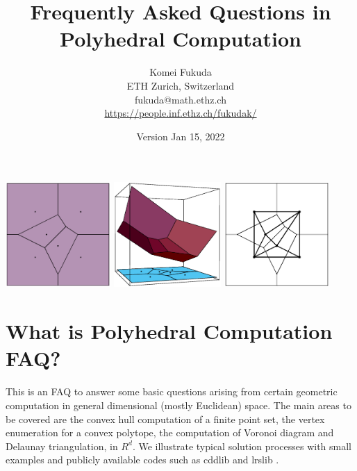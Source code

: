 \documentclass[[a4paper,12pt]{article}
\title
{Frequently Asked Questions in Polyhedral Computation}
\author
{{Komei Fukuda}\\
   ETH Zurich, Switzerland\\
    fukuda@math.ethz.ch\\
    \url{https://people.inf.ethz.ch/fukudak/}
}
\date{Version Jan 15, 2022}
\begin{document}
\maketitle

\begin{center}
\includegraphics[height=40mm]{vtest_fig_vo.eps}
\includegraphics[height=40mm]{vtest_fig_vo3d.eps}
\includegraphics[height=40mm]{vtest_fig_vode.eps}
\end{center}

\tableofcontents


\section{What is Polyhedral Computation FAQ?}  \label{Sec:intro}

This is an FAQ to answer some basic questions arising from
certain geometric computation in general dimensional 
(mostly Euclidean) space.   The main areas to be covered
are the convex hull computation of a finite point set, 
the vertex enumeration for a convex polytope,
the computation of Voronoi diagram and Delaunay triangulation, in $R^d$.
We illustrate typical solution processes with small examples and
publicly available codes such as cddlib \cite{f-cddhome}  and lrslib \cite{a-lrshome-01}.
\end{document}
